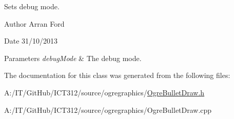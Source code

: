 Sets debug mode. 

\begin{DoxyAuthor}{Author}
Arran Ford 
\end{DoxyAuthor}
\begin{DoxyDate}{Date}
31/10/2013
\end{DoxyDate}

\begin{DoxyParams}{Parameters}
{\em debug\-Mode} & The debug mode. \\
\hline
\end{DoxyParams}


The documentation for this class was generated from the following files\-:\begin{DoxyCompactItemize}
\item 
A\-:/\-I\-T/\-Git\-Hub/\-I\-C\-T312/source/ogregraphics/\hyperlink{_ogre_bullet_draw_8h}{Ogre\-Bullet\-Draw.\-h}\item 
A\-:/\-I\-T/\-Git\-Hub/\-I\-C\-T312/source/ogregraphics/Ogre\-Bullet\-Draw.\-cpp\end{DoxyCompactItemize}

